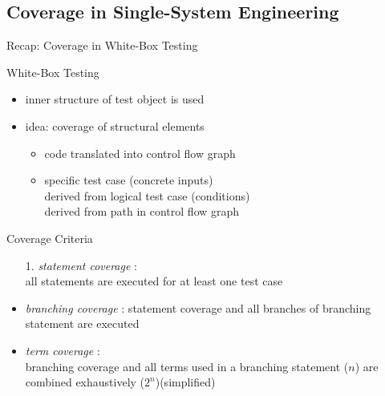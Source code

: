 \subsection{Coverage in Single-System Engineering}
\begin{frame}{Recap: Coverage in White-Box Testing{}  \mytitlesource{\ludewiglichter}}
	\begin{mycolumns}
		\begin{definition}{White-Box Testing }
			\begin{itemize}
				\item inner structure of test object is used
				\item idea: coverage of structural elements
				\begin{itemize}
					\item code translated into control flow graph
					\item specific test case (concrete inputs)\\derived from logical test case (conditions)\\derived from path in control flow graph
				\end{itemize}	
			\end{itemize}
		\end{definition}
	\mynextcolumn
		\begin{definition}{Coverage Criteria }
			\begin{itemize}
				\item[1.] \emph{statement coverage} :\\all statements are executed for at least one test case
				\item<3->[2.] \emph{branching coverage} : statement coverage and all branches of branching statement are executed %
				\item<4->[3.] \emph{term coverage} :\\branching coverage and all terms used in a branching statement ($n$) are combined exhaustively ($2^n$)\hfill(simplified)
			\end{itemize}
		\end{definition}
	\end{mycolumns}
\end{frame}

